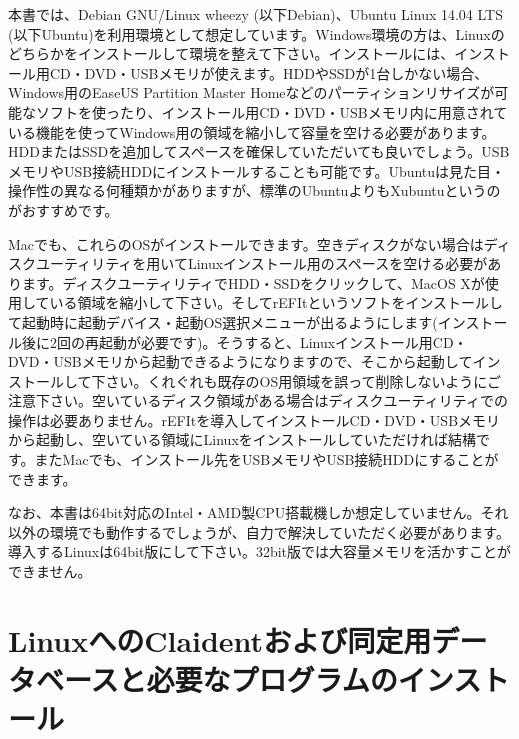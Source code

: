 \documentclass[titlepage,10pt,a4paper]{jsbook}
\begin{document}
本書では、Debian GNU/Linux wheezy (以下Debian)、Ubuntu Linux 14.04 LTS (以下Ubuntu)を利用環境として想定しています。Windows環境の方は、Linuxのどちらかをインストールして環境を整えて下さい。インストールには、インストール用CD・DVD・USBメモリが使えます。HDDやSSDが1台しかない場合、Windows用のEaseUS Partition Master Homeなどのパーティションリサイズが可能なソフトを使ったり、インストール用CD・DVD・USBメモリ内に用意されている機能を使ってWindows用の領域を縮小して容量を空ける必要があります。HDDまたはSSDを追加してスペースを確保していただいても良いでしょう。USBメモリやUSB接続HDDにインストールすることも可能です。Ubuntuは見た目・操作性の異なる何種類かがありますが、標準のUbuntuよりもXubuntuというのがおすすめです。

Macでも、これらのOSがインストールできます。空きディスクがない場合はディスクユーティリティを用いてLinuxインストール用のスペースを空ける必要があります。ディスクユーティリティでHDD・SSDをクリックして、MacOS Xが使用している領域を縮小して下さい。そしてrEFItというソフトをインストールして起動時に起動デバイス・起動OS選択メニューが出るようにします(インストール後に2回の再起動が必要です)。そうすると、Linuxインストール用CD・DVD・USBメモリから起動できるようになりますので、そこから起動してインストールして下さい。くれぐれも既存のOS用領域を誤って削除しないようにご注意下さい。空いているディスク領域がある場合はディスクユーティリティでの操作は必要ありません。rEFItを導入してインストールCD・DVD・USBメモリから起動し、空いている領域にLinuxをインストールしていただければ結構です。またMacでも、インストール先をUSBメモリやUSB接続HDDにすることができます。

なお、本書は64bit対応のIntel・AMD製CPU搭載機しか想定していません。それ以外の環境でも動作するでしょうが、自力で解決していただく必要があります。導入するLinuxは64bit版にして下さい。32bit版では大容量メモリを活かすことができません。

\section{LinuxへのClaidentおよび同定用データベースと必要なプログラムのインストール}
\end{document}

